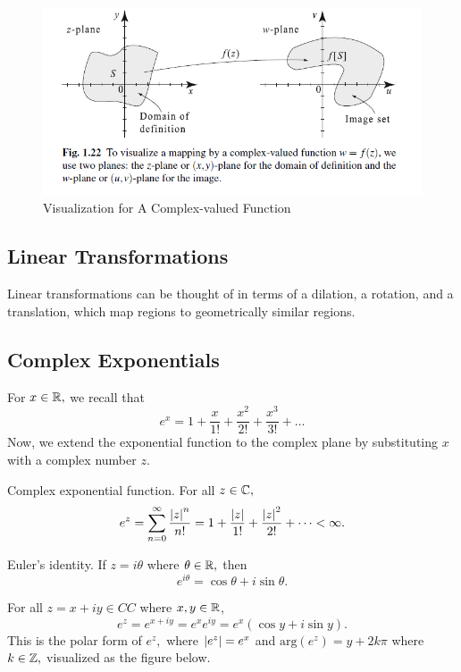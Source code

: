 \documentclass[11pt,reqno,oneside,a4paper]{article}
\begin{document}
\begin{figure}[htp]
	\centering
	\includegraphics[width=0.8\linewidth]{gfx/complex function vis.png}
	\caption{Visualization for A Complex-valued Function}
\end{figure}


\subsection{Linear Transformations}
Linear transformations can be thought of in terms of a dilation, a rotation, and a translation, which map regions to geometrically similar regions.




\subsection{Complex Exponentials}
For $x\in \mathbb R,$ we recall that $$e^x = 1 + \frac{x}{1!} + \frac{x^2}{2!} + \frac{x^3}{3!} + \dots$$
Now, we extend the exponential function to the complex plane by substituting $x$ with a complex number $z$. 

\begin{defn}{Complex exponential function.}
For all $z \in \mathbb C,$ 
$$e^z = \sum_{n=0}^{\infty} \frac{\left\lvert z\right\rvert^n}{n!} =1+\frac{\left\lvert z\right\rvert}{1!}+\frac{\left\lvert z\right\rvert^2}{2!} + \dots < \infty .$$
\end{defn}

\begin{thm}{Euler's identity.} 
If $z=i\theta$ where $\theta \in \mathbb R,$ then
$$e^{i\theta} = \cos \theta + i\sin\theta.$$
\end{thm}

\begin{cor}
For all $z = x+iy \in CC$ where $x, y \in \mathbb R$, $$e^z = e^{x+iy} = e^xe^{iy} = e^x(\cos y + i\sin y).$$
This is the polar form of $e^z,$ where $\left\lvert e^z\right\rvert = e^x$ and $\text{arg}(e^z) = y+2k\pi$ where $k\in\mathbb Z,$ visualized as the figure below.
\end{cor}
\end{document}
